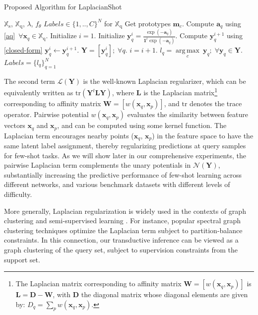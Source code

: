 \documentclass{article}
\DeclareMathOperator*{\argmax}{arg\,max}
\newcommand{\yy}{{\mathbf y}}
\newcommand{\ftheta}{f_{\theta}}
\newcommand{\Ncal}{\mathcal{N}}
\newcommand{\Bcal}{\mathcal{B}}
\newcommand{\Lcal}{\mathcal{L}}
\newcommand{\LL}{\mathbf L}
\newcommand{\xxq}{\mathbf{x}}
\newcommand{\XXs}{\mathbb{X}_{\text{s}}}
\newcommand{\XXq}{\mathbb{X}_{\text{q}}}
\newcommand{\YY}{\mathbf Y}
\newcommand{\DD}{\mathbf D}
\newcommand{\WW}{\mathbf W}
\newcommand{\mm}{{\mathbf m}}
\begin{document}
\begin{algorithm}[tb]
  \caption{Proposed Algorithm for LaplacianShot}
  \label{alg}
\begin{algorithmic}
   $\XXs$, $\XXq$, $\lambda$, $\ftheta$
   $Labels \in \{1,..,C\}^{N}$ for $\XXq$
  \STATE Get prototypes $\mm_c$.
  \STATE Compute $\mathbf{a}_q$ using \eqref{aq}~$\forall \xxq_q \in \XXq$.
  \STATE Initialize $i = 1$.
  \STATE Initialize $\yy^i_{q} =\frac{\exp(-\mathbf{a}_q)}{\mathbf{1}^t\exp(-\mathbf{a}_q)}$.
  \REPEAT
  \STATE Compute $\yy^{i+1}_q$ using \eqref{closed-form}
  \STATE $\yy^{i}_q \leftarrow \yy^{i+1}_q$.
  \STATE $\YY = [\yy^i_q];\; \forall q$.
  \STATE $i = i+1$.
  \UNTIL{$\Bcal_i(\YY)$ in \eqref{Aux-function} does not change}
  \STATE $l_q = \underset{c}{\argmax}~\yy_q ;\; \forall \yy_q \in \YY$.
  \STATE $Labels = \{l_q\}_{q=1}^{N}$
\end{algorithmic}
\end{algorithm}

The second term $\Lcal(\YY)$ is the well-known Laplacian regularizer, which can be equivalently  written as $\mathrm{tr}(\YY^t \LL \YY)$, where $\LL$ is the Laplacian matrix\footnote{The Laplacian matrix corresponding 
to affinity matrix $\WW = [w (\xxq_q, \xxq_p)]$ is $\LL= \DD-\WW$, with $\DD$ the diagonal matrix whose diagonal elements are given by: $D_q = \sum_pw(\mathbf{x}_q,\mathbf{x}_p)$.} 
corresponding 
to affinity matrix $\WW = [w (\xxq_q, \xxq_p)]$, and $\mathrm{tr}$ denotes the trace operator. Pairwise potential $w (\xxq_q, \xxq_p)$ 
evaluates the similarity between feature vectors $\xxq_q$ and $\xxq_p$, and can be computed
using some kernel function. 
The Laplacian term encourages nearby points ($\xxq_q$, $\xxq_p$) in the feature space to have the same latent label assignment, thereby regularizing 
predictions at query samples for few-shot tasks. As we will show later in our comprehensive experiments, the pairwise Laplacian term complements the unary potentials in $\Ncal(\YY)$, substantially increasing the predictive performance of few-shot learning across different networks, and various benchmark datasets with different levels of difficulty. 

More generally, Laplacian regularization is widely used in the contexts of graph clustering \cite{VonLuxburg2007,ShiMalik2000,ziko2018scalable,WangCarreira-Perpinan2014} and semi-supervised learning \cite{weston2012deep, belkin2006manifold}. For instance, popular spectral graph clustering techniques \cite{VonLuxburg2007,ShiMalik2000} optimize the Laplacian term subject to partition-balance constraints. In this connection, our transductive inference can be viewed as a graph clustering of the query set, subject to supervision constraints from the support set. 
\end{document}
